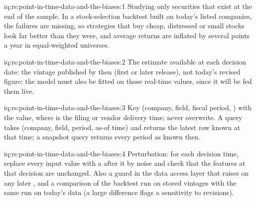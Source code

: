 \begin{solution}{iq:rs:point-in-time-data-and-the-biases:1}
Studying only securities that exist at the end of the sample. In a stock-selection backtest built on today's listed companies,
the failures are missing, so strategies that buy cheap, distressed or small stocks look far better than they were, and average
returns are inflated by several points a year in equal-weighted universes.
\end{solution}

\begin{solution}{iq:rs:point-in-time-data-and-the-biases:2}
The estimate available at each decision date: the vintage published by then (first or later release), not today's revised
figure; the model must also be fitted on those real-time values, since it will be fed them live.
\end{solution}

\begin{solution}{iq:rs:point-in-time-data-and-the-biases:3}
Key (company, field, fiscal period, ) with the value, where  is the filing or vendor delivery time;
never overwrite. A query takes (company, field, period, as-of time) and returns the latest row known at that time; a snapshot
query returns every period as known then.
\end{solution}

\begin{solution}{iq:rs:point-in-time-data-and-the-biases:4}
Perturbation: for each decision time, replace every input value with a  after it by noise and check that the
features at that decision are unchanged. Also a guard in the data access layer that raises on any later , and
a comparison of the backtest run on stored vintages with the same run on today's data (a large difference flags a sensitivity to
revisions).
\end{solution}

